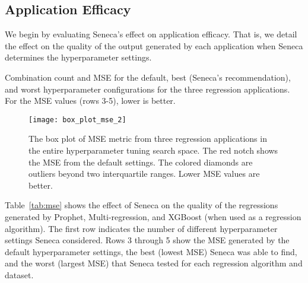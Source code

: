\subsection{Application Efficacy}

We begin by evaluating Seneca's effect on application efficacy.
That is, we detail the effect on the quality of the output generated by each
application when Seneca determines the hyperparameter settings. 

\begin{table}
\centering

\caption{Combination count and MSE for the default, best (Seneca's recommendation), and worst hyperparameter configurations for the three regression applications. 
For the MSE  values (rows 3-5), lower is better.
\label{tab:mse}}
\end{table}

\begin{figure}[t] \centering 
\vspace{-0.2in}
\texttt{[image: box\_plot\_mse\_2]}
\vspace{-0.4in}
\caption{The box plot of MSE metric from three regression applications in the entire hyperparameter tuning search space. The red notch shows the MSE from the default settings. The colored diamonds are outliers beyond two interquartile ranges. Lower MSE values are better.
\label{fig:box_plot_mse}}
\vspace{-0.2in}
\end{figure}

Table~\ref{tab:mse} shows the effect of Seneca on the quality of the
regressions generated by Prophet, Multi-regression, and XGBoost (when used as
a regression algorithm). The first row indicates the number of
different hyperparameter settings Seneca considered.  Rows 3 through 5 show
the MSE generated by the default hyperparameter settings, the best (lowest
MSE) Seneca was able to find, and the worst (largest MSE) that Seneca tested
for each regression algorithm and dataset.

%

